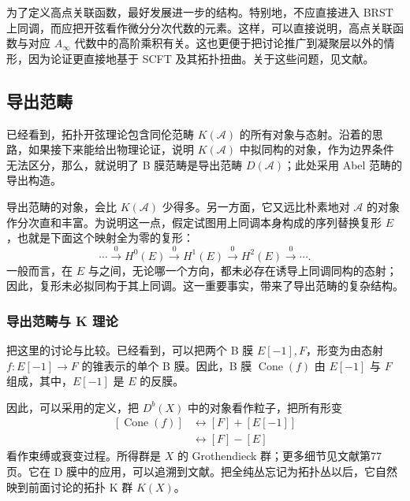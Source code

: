 为了定义高点关联函数，最好发展进一步的结构。特别地，不应直接进入 BRST 上同调，而应把开弦看作微分分次代数的元素。这样，可以直接说明，高点关联函数与对应 $A_\infty$ 代数中的高阶乘积有关。这也更便于把讨论推广到凝聚层以外的情形，因为论证更直接地基于 SCFT 及其拓扑扭曲。关于这些问题，见文献。

\subsection{导出范畴}\label{sec:5.3.3}

已经看到，拓扑开弦理论包含同伦范畴 $K(\mathcal{A})$ 的所有对象与态射。沿着的思路，如果接下来能给出物理论证，说明 $K(\mathcal{A})$ 中拟同构的对象，作为边界条件无法区分，那么，就说明了 B 膜范畴是导出范畴 $D(\mathcal{A})$；此处采用 Abel 范畴的导出构造。

导出范畴的对象，会比 $K(\mathcal{A})$ 少得多。另一方面，它又远比朴素地对 $\mathcal{A}$ 的对象作分次直和丰富。为说明这一点，假定试图用上同调本身构成的序列替换复形 $E$，也就是下面这个映射全为零的复形：
\begin{equation}\label{eq:5.54}
\cdots\xrightarrow{0}H^0(E)\xrightarrow{0}H^1(E)
\xrightarrow{0}H^2(E)\xrightarrow{0}\cdots.
\end{equation}
一般而言，在 $E$ 与之间，无论哪一个方向，都未必存在诱导上同调同构的态射；因此，复形未必拟同构于其上同调。这一重要事实，带来了导出范畴的复杂结构。

\subsubsection{导出范畴与 K 理论}\label{sec:5.3.3.1}

把这里的讨论与比较。已经看到，可以把两个 B 膜 $E[-1],F$，形变为由态射 $f\colon E[-1]\to F$ 的锥表示的单个 B 膜。因此，B 膜 $\operatorname{Cone}(f)$ 由 $E[-1]$ 与 $F$ 组成，其中，$E[-1]$ 是 $E$ 的反膜。

因此，可以采用的定义，把 $D^b(X)$ 中的对象看作粒子，把所有形变
\begin{equation}\label{eq:5.55}
\begin{aligned}
[\operatorname{Cone}(f)]&\longleftrightarrow[F]+[E[-1]]\\
&\longleftrightarrow[F]-[E]
\end{aligned}
\end{equation}
看作束缚或衰变过程。所得群是 $X$ 的 Grothendieck 群；更多细节见文献第77页。它在 D 膜中的应用，可以追溯到文献。把全纯丛忘记为拓扑丛以后，它自然映到前面讨论的拓扑 K 群 $K(X)$。

